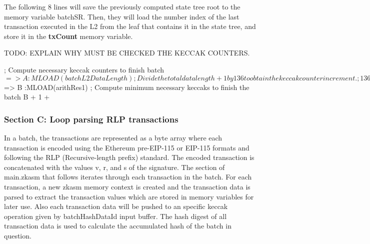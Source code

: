 The following 8 lines will save the previously computed state tree root to the memory variable batchSR. Then, they will load the number index of the last transaction executed in the L2 from the leaf that contains it in the state tree, and store it in the \textbf{txCount} memory variable.

TODO: EXPLAIN WHY MUST BE CHECKED THE KECCAK COUNTERS.



\begin{zkasm}
    
    ; Compute necessary keccak counters to finish batch
    $ => A          :MLOAD(batchL2DataLength)
    ; Divide the total data length + 1 by 136 to obtain the keccak counter increment.
    ; 136 is the value used by the prover to increment keccak counters
    A + 1                                   :MSTORE(arithA)
    136                                     :MSTORE(arithB), CALL(divARITH); in: [arithA, arithB] out: [arithRes1: arithA/arithB, arithRes2: arithA%
    $ => B                                  :MLOAD(arithRes1)
    ; Compute minimum necessary keccaks to finish the batch
    B + 1 + %
\end{zkasm}



\subsubsection{Section C: Loop parsing RLP transactions}


In a batch, the transactions are represented as a byte array where each transaction is encoded using the Ethereum pre-EIP-115 or EIP-115 formats and following the RLP (Recursive-length prefix) standard. The encoded transaction is concatenated with the values v, r, and s of the signature. The section of main.zkasm that follows iterates through each transaction in the batch. For each transaction, a new zkasm memory context is created and the transaction data is parsed to extract the transaction values which are stored in memory variables for later use. Also each transaction data will be pushed to an specific keccak operation given by batchHashDataId  input buffer. The hash digest of all transaction data is used to calculate the accumulated hash of the batch in question.

